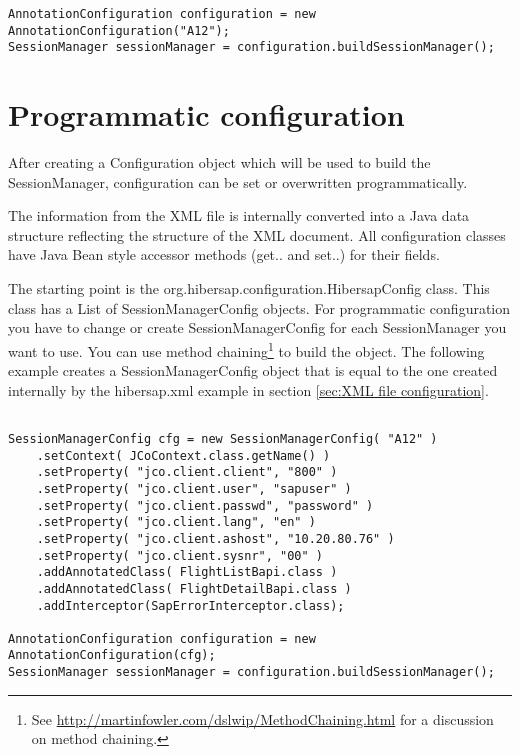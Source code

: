 \begin{Verbatim}[frame=single,label=hibersap.xml]
AnnotationConfiguration configuration = new AnnotationConfiguration("A12");
SessionManager sessionManager = configuration.buildSessionManager();
\end{Verbatim}


\section{Programmatic configuration}
\label{sec:Programmatic configuration}

After creating a Configuration object which will be used to build the SessionManager, configuration can be set or
overwritten programmatically.

The information from the XML file is internally converted into a Java data structure reflecting the structure of the
XML document. All configuration classes have Java Bean style accessor methods (get.. and set..) for
their fields. 

The starting point is the org.hibersap.configuration.HibersapConfig class. This class has a List of
SessionManagerConfig objects. For programmatic configuration you have to change or create SessionManagerConfig for each 
SessionManager you want to use. You can use method chaining\footnote{See
\url{http://martinfowler.com/dslwip/MethodChaining.html} for a discussion on method chaining.} to build the
object. The following example creates a  SessionManagerConfig object that is equal to the one created internally by the
hibersap.xml example in section \ref{sec:XML file configuration}. 

\begin{Verbatim}[frame=single,label=Programmatic configuration]

SessionManagerConfig cfg = new SessionManagerConfig( "A12" )
    .setContext( JCoContext.class.getName() )
    .setProperty( "jco.client.client", "800" )
    .setProperty( "jco.client.user", "sapuser" )
    .setProperty( "jco.client.passwd", "password" )
    .setProperty( "jco.client.lang", "en" )
    .setProperty( "jco.client.ashost", "10.20.80.76" )
    .setProperty( "jco.client.sysnr", "00" )
    .addAnnotatedClass( FlightListBapi.class )
    .addAnnotatedClass( FlightDetailBapi.class )
    .addInterceptor(SapErrorInterceptor.class);

AnnotationConfiguration configuration = new AnnotationConfiguration(cfg);
SessionManager sessionManager = configuration.buildSessionManager();

\end{Verbatim}








